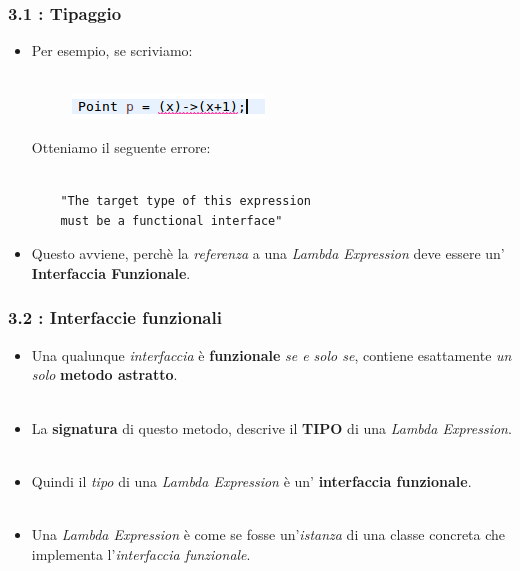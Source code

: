 \documentclass{beamer}
\begin{document}

\begin{frame}[fragile]
	\frametitle{\textbf{3.1 : Tipaggio}}
	\begin{itemize}
		\item 
			Per esempio, se scriviamo:\\\
			\begin{figure}
				\centering
				\includegraphics[width=0.3\linewidth]{image/target.png}
				\label{fig:target}
			\end{figure}
			Otteniamo il seguente errore:\\\
\begin{lstlisting}
	"The target type of this expression
	must be a functional interface"
\end{lstlisting}
		\item 
			Questo avviene, perchè la \textit{referenza} a una \textit{Lambda Expression} deve essere un' \textbf{Interfaccia Funzionale}.
	\end{itemize}
\end{frame}


\begin{frame}
	\frametitle{\textbf{3.2 : Interfaccie funzionali}}
	\begin{itemize}
		\item
			Una qualunque \textit{interfaccia} è \textbf{funzionale} \textit{se e solo se}, contiene esattamente \textit{un solo} \textbf{metodo astratto}.\\\
		\item 
			La \textbf{signatura} di questo metodo, descrive il \textbf{TIPO} di una \textit{Lambda Expression}.\\\
		\item 
			Quindi il \textit{tipo} di una \textit{Lambda Expression} è un' \textbf{interfaccia funzionale}.\\\
		\item 
			Una \textit{Lambda Expression} è come se fosse un'\textit{istanza} di una classe concreta che implementa l'\textit{interfaccia funzionale}.
	\end{itemize}
\end{frame}

\end{document}
